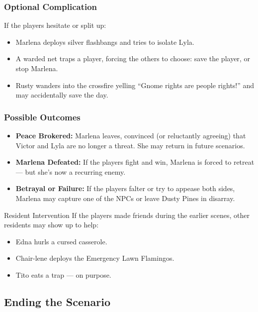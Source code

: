 \begin{multicols}{2}
\subsubsection*{Optional Complication}
If the players hesitate or split up:
\begin{itemize}
    \item Marlena deploys silver flashbangs and tries to isolate Lyla.
    \item A warded net traps a player, forcing the others to choose: save the player, or stop Marlena.
    \item Rusty wanders into the crossfire yelling “Gnome rights are people rights!” and may accidentally save the day.
\end{itemize}

\subsubsection*{Possible Outcomes}
\begin{itemize}
    \item \textbf{Peace Brokered:} Marlena leaves, convinced (or reluctantly agreeing) that Victor and Lyla are no longer a threat. She may return in future scenarios.
    \item \textbf{Marlena Defeated:} If the players fight and win, Marlena is forced to retreat — but she’s now a recurring enemy.
    \item \textbf{Betrayal or Failure:} If the players falter or try to appease both sides, Marlena may capture one of the NPCs or leave Dusty Pines in disarray.
\end{itemize}

\begin{CommentBox}{Resident Intervention}
If the players made friends during the earlier scenes, other residents may show up to help:
\begin{itemize}
    \item Edna hurls a cursed casserole.
    \item Chair-lene deploys the Emergency Lawn Flamingos.
    \item Tito eats a trap — on purpose.
\end{itemize}
\end{CommentBox}

\subsection*{Ending the Scenario}


\end{multicols}
